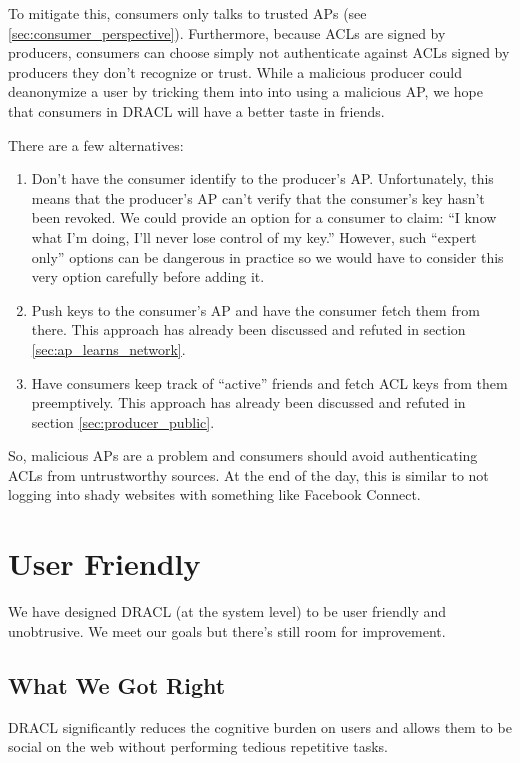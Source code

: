 \documentclass[pdftex,12pt,a4papaer,twoside,notitlepage]{report}
\begin{document}
To mitigate this, consumers only talks to trusted APs (see
\cref{sec:consumer_perspective}). Furthermore, because ACLs are signed by
producers, consumers can choose simply not authenticate against ACLs signed by
producers they don't recognize or trust. While a malicious producer could
deanonymize a user by tricking them into into using a malicious AP, we hope that
consumers in DRACL will have a better taste in friends.

There are a few alternatives:

\begin{enumerate}
\item Don't have the consumer identify to the producer's AP. Unfortunately, this
  means that the producer's AP can't verify that the consumer's key hasn't been
  revoked. We could provide an option for a consumer to claim: ``I know what I'm
  doing, I'll never lose control of my key.'' However, such ``expert only''
  options can be dangerous in practice so we would have to consider this very
  option carefully before adding it.
\item Push keys to the consumer's AP and have the consumer fetch them from
  there. This approach has already been discussed and refuted in section
  \cref{sec:ap_learns_network}.
\item Have consumers keep track of ``active'' friends and fetch ACL keys from
  them preemptively. This approach has already been discussed and refuted in
  section \cref{sec:producer_public}.
\end{enumerate}

So, malicious APs are a problem and consumers should avoid authenticating ACLs
from untrustworthy sources. At the end of the day, this is similar to not
logging into shady websites with something like Facebook Connect.


\section{User Friendly}
\label{sec:user_friendly}

We have designed DRACL (at the system level) to be user friendly and
unobtrusive. We meet our goals but there's still room for improvement.

\subsection{What We Got Right}

DRACL significantly reduces the cognitive burden on users and allows them to be
social on the web without performing tedious repetitive tasks.
\end{document}
